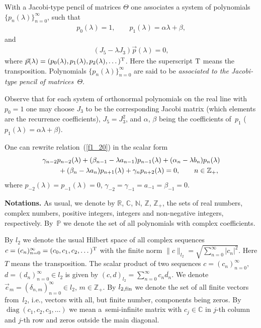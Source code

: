 \documentclass[11pt]{article}
\numberwithin{equation}{section}
\begin{document}
With a Jacobi-type pencil of matrices $\Theta$ one associates a system of polynomials $\{ p_n(\lambda) \}_{n=0}^\infty$, such that
\begin{gather*} p_0(\lambda) = 1,\qquad p_1(\lambda) = \alpha\lambda + \beta, \end{gather*}
and
\begin{gather}\label{f1_20}
(J_5 - \lambda J_3) \vec p(\lambda) = 0,
\end{gather}
where $\vec p(\lambda) = (p_0(\lambda), p_1(\lambda), p_2(\lambda),\dots)^{\rm T}$. Here the superscript ${\rm T}$ means the transposition. Polynomials $\{ p_n(\lambda) \}_{n=0}^\infty$ are said to be \textit{associated to the Jacobi-type pencil of matrices~$\Theta$}.

Observe that for each system of orthonormal polynomials on the real line with $p_0=1$ one may choose $J_3$ to be the corresponding Jacobi matrix (which elements are the recurrence coef\/f\/icients), $J_5 = J_3^2$, and $\alpha$, $\beta$ being the coef\/f\/icients of~$p_1$ ($p_1(\lambda) = \alpha\lambda + \beta$).

One can rewrite relation~(\ref{f1_20}) in the scalar form
\begin{gather} \gamma_{n-2} p_{n-2}(\lambda) + (\beta_{n-1}-\lambda a_{n-1}) p_{n-1}(\lambda) + (\alpha_n-\lambda b_n) p_n(\lambda) \notag \\
\qquad{} + (\beta_n-\lambda a_n) p_{n+1}(\lambda) + \gamma_n p_{n+2}(\lambda) = 0,\qquad n\in\mathbb{Z}_+, \label{f1_30}
\end{gather}
where $p_{-2}(\lambda) = p_{-1}(\lambda) = 0$, $\gamma_{-2} = \gamma_{-1} = a_{-1} = \beta_{-1} = 0$.

\setcounter{section}{1}
\setcounter{subsection}{0}
\setcounter{subsubsection}{0}
\setcounter{Theorem}{2}
\setcounter{equation}{5}
{\bf Notations.} As usual, we denote by $\mathbb{R}$, $\mathbb{C}$, $\mathbb{N}$, $\mathbb{Z}$, $\mathbb{Z}_+$, the sets of real numbers, complex numbers, positive integers, integers and non-negative integers, respectively. By~$\mathbb{P}$ we denote the set of all polynomials with complex coef\/f\/icients.

By $l_2$ we denote the usual Hilbert space of all complex sequences $c = (c_n)_{n=0}^\infty = (c_0,c_1,c_2,\dots)^{\rm T}$ with the f\/inite norm $\| c \|_{l_2} = \sqrt{\sum\limits_{n=0}^\infty |c_n|^2}$. Here $T$ means the transposition. The scalar product of two sequences $c = (c_n)_{n=0}^\infty$, $d = (d_n)_{n=0}^\infty\in l_2$ is given by $(c,d)_{l_2} = \sum\limits_{n=0}^\infty c_n \overline{d_n}$. We denote $\vec e_m = (\delta_{n,m})_{n=0}^\infty\in l_2$, $m\in\mathbb{Z}_+$. By $l_{2,{\rm f\/in}}$ we denote the set of all f\/inite vectors from~$l_2$, i.e., vectors with all, but f\/inite number, components being zeros. By $\operatorname{diag} (c_1,c_2,c_3,\dots)$ we mean a~semi-inf\/inite matrix with $c_j\in\mathbb{C}$ in $j$-th column and $j$-th row and zeros outside the main diagonal.
\end{document}
